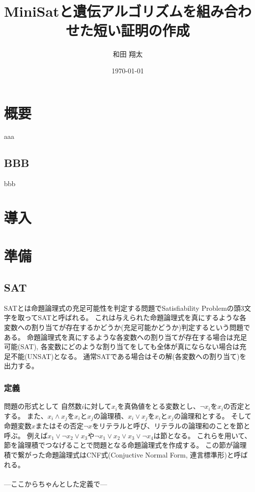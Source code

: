 \documentclass[titlepage]{jsarticle}
\title{MiniSatと遺伝アルゴリズムを組み合わせた短い証明の作成}
\author{和田 翔太}
\date{\today}
\begin{document}
\maketitle










\section{概要}
aaa
\subsection{BBB}
bbb










\section{導入}










\section{準備}





\subsection{SAT}



SATとは命題論理式の充足可能性を判定する問題でSatisfiability Problemの頭3文字を取ってSATと呼ばれる。
これは与えられた命題論理式を真にするような各変数への割り当てが存在するかどうか(充足可能かどうか)判定するという問題である。
命題論理式を真にするような各変数への割り当てが存在する場合は充足可能(SAT), 各変数にどのような割り当てをしても全体が真にならない場合は充足不能(UNSAT)となる。
通常SATである場合はその解(各変数への割り当て)を出力する。



\subsubsection{定義}
問題の形式として
自然数$i$に対して$x_i$を真偽値をとる変数とし、$\neg x_i$を$x_i$の否定とする。
また、$x_i \land x_j$を$x_i$と$x_j$の論理積、$x_i \lor x_j$を$x_i$と$x_j$の論理和とする。
そして命題変数$x$またはその否定$\neg x$をリテラルと呼び、リテラルの論理和のことを節と呼ぶ。
例えば$x_1 \lor \neg x_2 \lor x_3$や$\neg  x_1 \lor x_2 \lor x_3 \lor \neg x_4$は節となる。
これらを用いて、節を論理積でつなげることで問題となる命題論理式を作成する。
この節が論理積で繋がった命題論理式はCNF式(Conjuctive Normal Form, 連言標準形)と呼ばれる。
\\ \\
---ここからちゃんとした定義で---
\end{document}
